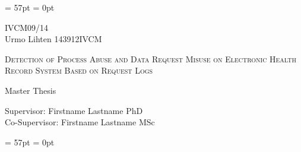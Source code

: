 \documentclass[a4paper, 12pt]{article}
\begin{document}
\thispagestyle{fancy} 
\renewcommand{\headrulewidth}{0pt} 
\renewcommand{\footrulewidth}{0pt} 
\headheight = 57pt 
\headsep = 0pt 

\vspace*{7 cm}

\begin{center} 
IVCM09/14\\[0cm]
Urmo Lihten 143912IVCM\\
\begin{LARGE}
	\textsc{Detection of Process Abuse and Data Request Misuse on Electronic Health Record System Based on Request Logs 	\\}
\end{LARGE}
Master Thesis\\[2cm]
\end{center}

\begin{flushright} %
Supervisor: Firstname Lastname PhD\\

Co-Supervisor: Firstname Lastname MSc\\[0cm]

\end{flushright}

\pagebreak %

\thispagestyle{fancy} %
\renewcommand{\headrulewidth}{0pt} %
\renewcommand{\footrulewidth}{0pt} %
\headheight = 57pt %
\headsep = 0pt %

\end{document}
